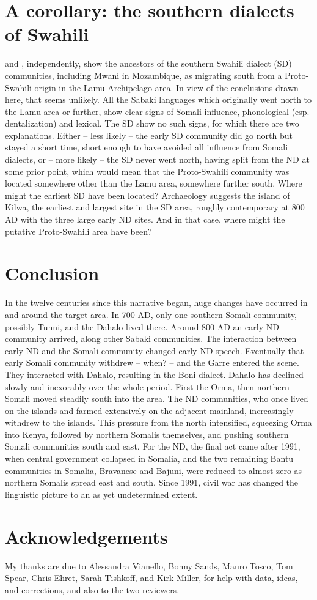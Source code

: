 \documentclass[output=paper,newtxmath,modfonts,nonflat,hidelinks]{langsci/langscibook}
\begin{document}
\section{A corollary: the southern dialects of Swahili}\label{sec:nurse:6} \citet[map p.345]{Möhlig1984} and \citet[map p.60]{Nurse1985}, independently, show the ancestors of the southern Swahili dialect (SD) communities, including Mwani in Mozambique, as migrating south from a Proto-Swahili origin in the Lamu Archipelago area. In view of the conclusions drawn here, that seems unlikely. All the Sabaki languages which originally went north to the Lamu area or further, show clear signs of Somali influence, phonological (esp. dentalization) and lexical. The SD show no such signs, for which there are two explanations. Either – less likely – the early SD community did go north but stayed a short time, short enough to have avoided all influence from Somali dialects, or – more likely – the SD never went north, having split from the ND at some prior point, which would mean that the Proto-Swahili community was located somewhere other than the Lamu area, somewhere further south. Where might the earliest SD have been located? Archaeology suggests the island of Kilwa, the earliest and largest site in the SD area, roughly contemporary at 800 AD with the three large early ND sites. And in that case, where might the putative Proto-Swahili area have been?

\section{Conclusion}\label{sec:nurse:7}  In the twelve centuries since this narrative began, huge changes have occurred in and around the target area. In 700 AD, only one southern Somali community, possibly Tunni, and the Dahalo lived there. Around 800 AD an early ND community arrived, along other Sabaki communities. The interaction between early ND and the Somali community changed early ND speech. Eventually that early Somali community withdrew – when? – and the Garre entered the scene. They interacted with Dahalo, resulting in the Boni dialect. Dahalo has declined slowly and inexorably over the whole period. First the Orma, then northern Somali moved steadily south into the area. The ND communities, who once lived on the islands and farmed extensively on the adjacent mainland, increasingly withdrew to the islands. This pressure from the north intensified, squeezing Orma into Kenya, followed by northern Somalis themselves, and pushing southern Somali communities south and east. For the ND, the final act came after 1991, when central government collapsed in Somalia, and the two remaining Bantu communities in Somalia, Bravanese and Bajuni, were reduced to almost zero as northern Somalis spread east and south. Since 1991, civil war has changed the linguistic picture to an as yet undetermined extent. 

\section{Acknowledgements} My thanks are due to Alessandra Vianello, Bonny Sands, Mauro Tosco, Tom Spear, Chris Ehret, Sarah Tishkoff, and Kirk Miller, for help with data, ideas, and corrections, and also to the two reviewers.

\sloppy
\printbibliography[heading=subbibliography,notkeyword=this]
\end{document}
